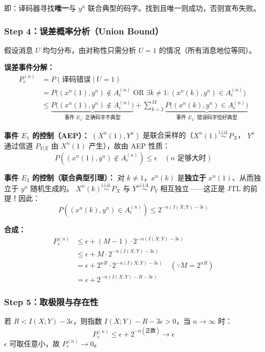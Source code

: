 \documentclass[12pt,a4paper]{ctexart}
\theoremstyle{definition}
\newcommand{\iid}{\overset{\text{i.i.d.}}{\sim}}
\begin{document}
即：译码器寻找\textbf{唯一}与 $y^n$ 联合典型的码字。找到且唯一则成功，否则宣布失败。

\subsubsection{Step 4：误差概率分析（Union Bound）}

假设消息 $U$ 均匀分布，由对称性只需分析 $U=1$ 的情况（所有消息地位等同）。

\textbf{误差事件分解：}
\begin{align*}
P_e^{(n)} &= P(\text{译码错误} \mid U=1) \\
&= P\Big((x^n(1),y^n) \notin A_\epsilon^{(n)}
          \;\text{OR}\; \exists k \neq 1: (x^n(k),y^n) \in A_\epsilon^{(n)}\Big) \\
&\leq \underbrace{P\big((x^n(1),y^n) \notin A_\epsilon^{(n)}\big)}_{\text{事件 }E_1:\ \text{正确码字不典型}}
      + \sum_{k=2}^{M} \underbrace{P\big((x^n(k),y^n) \in A_\epsilon^{(n)}\big)}_{\text{事件 }E_2:\ \text{错误码字恰好典型}}
\end{align*}

\textbf{事件 $E_1$ 的控制（AEP）：}
$(X^n(1), Y^n)$ 是联合采样的（$X^n(1) \iid P_X$，
$Y^n$ 通过信道 $P_{Y|X}$ 由 $X^n(1)$ 产生），故由 AEP 性质：
\[
P((x^n(1), y^n) \notin A_\epsilon^{(n)}) \leq \epsilon \quad (\text{$n$ 足够大时})
\]

\textbf{事件 $E_2$ 的控制（联合典型引理）：}
对 $k \neq 1$，$x^n(k)$ 是\textbf{独立于} $x^n(1)$、从而独立于 $y^n$ 随机生成的。
$X^n(k) \iid P_X$ 与 $Y^n \iid P_Y$ 相互独立——这正是 JTL 的前提！因此：
\[
P((x^n(k), y^n) \in A_\epsilon^{(n)}) \leq 2^{-n(I(X;Y)-3\epsilon)}
\]

\textbf{合成：}
\begin{align*}
P_e^{(n)} &\leq \epsilon + (M-1) \cdot 2^{-n(I(X;Y)-3\epsilon)} \\
          &\leq \epsilon + M \cdot 2^{-n(I(X;Y)-3\epsilon)} \\
          &= \epsilon + 2^{nR} \cdot 2^{-n(I(X;Y)-3\epsilon)}
            \quad (\because M = 2^{nR}) \\
          &= \epsilon + 2^{-n(I(X;Y)-R-3\epsilon)}
\end{align*}

\subsubsection{Step 5：取极限与存在性}

若 $R < I(X;Y) - 3\epsilon$，则指数 $I(X;Y)-R-3\epsilon > 0$，当 $n \to \infty$ 时：
\[
P_e^{(n)} \leq \epsilon + 2^{-n(\text{正数})} \to \epsilon
\]
$\epsilon$ 可取任意小，故 $P_e^{(n)} \to 0$。
\end{document}
